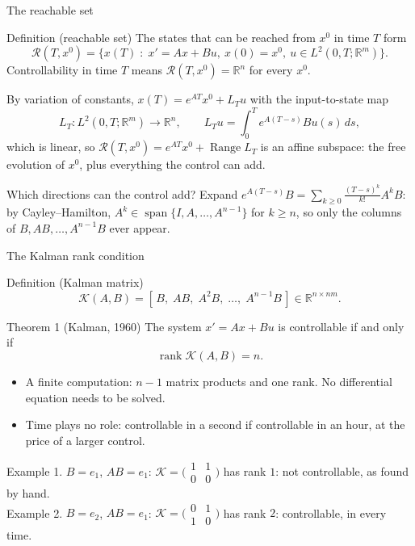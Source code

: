 \documentclass[10pt]{beamer}
\newcommand{\R}{\mathbb{R}}
\newcommand{\Kal}{\mathcal{K}}
\newcommand{\Reach}{\mathcal{R}}
\DeclareMathOperator{\Range}{Range}
\DeclareMathOperator{\rank}{rank}
\begin{document}
\begin{frame}{The reachable set}
\small
\begin{mathbox}{Definition (reachable set)}
The states that can be reached from $x^0$ in time $T$ form
\[
\Reach(T,x^0)=\big\{x(T)\;:\;x'=Ax+Bu,\ x(0)=x^0,\ u\in L^2(0,T;\R^m)\big\}.
\]
Controllability in time $T$ means $\Reach(T,x^0)=\R^n$ for every $x^0$.
\end{mathbox}
By variation of constants, $x(T)=e^{AT}x^0+L_Tu$ with the \alert{input-to-state map}
\[
L_T:L^2(0,T;\R^m)\to\R^n,\qquad L_Tu=\int_0^Te^{A(T-s)}Bu(s)\,ds ,
\]
which is linear, so $\Reach(T,x^0)=e^{AT}x^0+\Range L_T$ is an \alert{affine subspace}: the free evolution of $x^0$, plus everything the control can add.

\medskip
Which directions can the control add? Expand $e^{A(T-s)}B=\sum_{k\ge0}\frac{(T-s)^k}{k!}A^kB$: by \alert{Cayley--Hamilton}, $A^k\in\operatorname{span}\{I,A,\dots,A^{n-1}\}$ for $k\ge n$, so only the columns of $B,AB,\dots,A^{n-1}B$ ever appear.
\end{frame}


\begin{frame}{The Kalman rank condition}
\begin{mathbox}{Definition (Kalman matrix)}
\[
\Kal(A,B)=[\,B,\;AB,\;A^2B,\;\dots,\;A^{n-1}B\,]\in\R^{n\times nm}.
\]
\end{mathbox}
\begin{mathbox}{Theorem 1 (Kalman, 1960)}
The system $x'=Ax+Bu$ is controllable if and only if
\[
\rank\Kal(A,B)=n .
\]
\end{mathbox}
\footnotesize
\begin{itemize}
\item A \alert{finite computation}: $n-1$ matrix products and one rank. No differential equation needs to be solved.
\item \alert{Time plays no role}: controllable in a second if controllable in an hour, at the price of a larger control.
\end{itemize}

\smallskip
\alert{Example 1.} $B=e_1$, $AB=e_1$: $\Kal=\big(\begin{smallmatrix}1&1\\0&0\end{smallmatrix}\big)$ has rank $1$: not controllable, as found by hand.\\
\alert{Example 2.} $B=e_2$, $AB=e_1$: $\Kal=\big(\begin{smallmatrix}0&1\\1&0\end{smallmatrix}\big)$ has rank $2$: controllable, in every time.
\end{frame}
\end{document}
